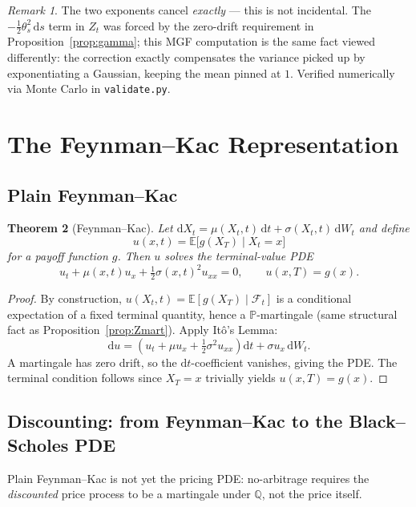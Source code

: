 \documentclass[11pt]{article}
\newtheorem{theorem}{Theorem}[section]
\theoremstyle{definition}
\theoremstyle{remark}
\newtheorem{remark}[theorem]{Remark}
\newcommand{\dd}{\mathrm{d}}
\newcommand{\E}{\mathbb{E}}
\renewcommand{\P}{\mathbb{P}}
\newcommand{\Q}{\mathbb{Q}}
\newcommand{\F}{\mathcal{F}}
\begin{document}
\begin{remark}
The two exponents cancel \emph{exactly} — this is not incidental. The $-\tfrac12\theta_s^2\,\dd s$
term in $Z_t$ was forced by the zero-drift requirement in Proposition~\ref{prop:gamma}; this MGF
computation is the same fact viewed differently: the correction exactly compensates the variance
picked up by exponentiating a Gaussian, keeping the mean pinned at $1$. Verified numerically via
Monte Carlo in \texttt{validate.py}.
\end{remark}

\section{The Feynman--Kac Representation}

\subsection{Plain Feynman--Kac}

\begin{theorem}[Feynman--Kac]
\label{thm:fk}
Let $\dd X_t = \mu(X_t,t)\,\dd t + \sigma(X_t,t)\,\dd W_t$ and define
\[
u(x,t) = \E\big[g(X_T) \mid X_t = x\big]
\]
for a payoff function $g$. Then $u$ solves the terminal-value PDE
\[
u_t + \mu(x,t)u_x + \tfrac12\sigma(x,t)^2u_{xx} = 0, \qquad u(x,T) = g(x).
\]
\end{theorem}

\begin{proof}
By construction, $u(X_t,t) = \E[g(X_T)\mid \F_t]$ is a conditional expectation of a fixed terminal
quantity, hence a $\P$-martingale (same structural fact as Proposition~\ref{prop:Zmart}). Apply
Itô's Lemma:
\[
\dd u = \left(u_t + \mu u_x + \tfrac12\sigma^2u_{xx}\right)\dd t + \sigma u_x\,\dd W_t.
\]
A martingale has zero drift, so the $\dd t$-coefficient vanishes, giving the PDE. The terminal
condition follows since $X_T = x$ trivially yields $u(x,T)=g(x)$.
\end{proof}

\subsection{Discounting: from Feynman--Kac to the Black--Scholes PDE}

Plain Feynman--Kac is not yet the pricing PDE: no-arbitrage requires the \emph{discounted} price
process to be a martingale under $\Q$, not the price itself.
\end{document}
